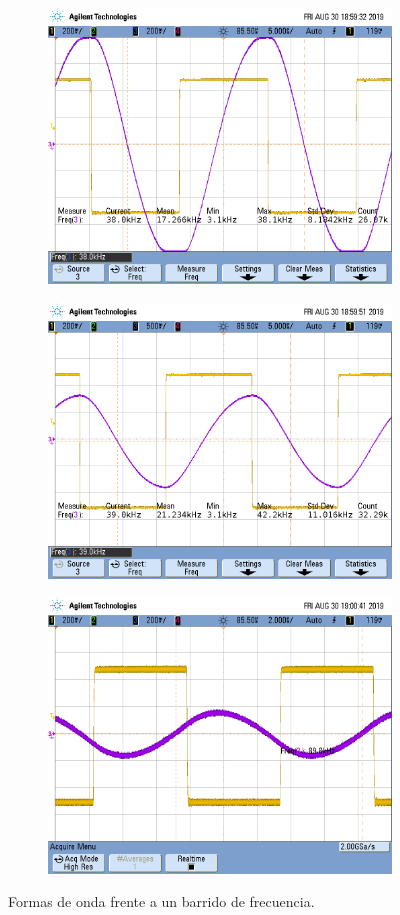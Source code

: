 \begin{figure}[H]
\centering
\begin{subfigure}
  \centering
  \includegraphics[width=.8\textwidth]{Ejercicio2/Mediciones/A/waveform6.png}  
\end{subfigure}
\begin{subfigure}
  \centering
  \includegraphics[width=.8\textwidth]{Ejercicio2/Mediciones/A/waveform7.png}  
\end{subfigure}
\begin{subfigure}
  \centering
  \includegraphics[width=.8\textwidth]{Ejercicio2/Mediciones/A/waveform8.png}  
\end{subfigure}
\caption{Formas de onda frente a un barrido de frecuencia.}
\label{fig:fig}
\end{figure}

